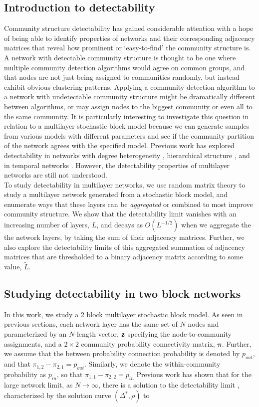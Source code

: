 \subsection{Introduction to detectability}
Community structure detectability has gained considerable attention \cite{detect20,detect21,detect22,detect23,detect24,detect25} with a hope of being able to identify properties of networks and their corresponding adjacency matrices that reveal how prominent or `easy-to-find' the community structure is. A network with detectable community structure is thought to be one where multiple community detection algorithms would agree on common groups, and that nodes are not just being assigned to communities randomly, but instead exhibit obvious clustering patterns. Applying a community detection algorithm to a network with undetectable community structure might be dramatically different between algorithms, or may assign nodes to the biggest community or even all to the same community. It is particularly interesting to investigate this question in relation to a multilayer stochastic block model because we can generate samples from various models with different parameters and see if the community partition of the network agrees with the specified model. Previous work has explored detectability in networks with degree heterogeneity \cite{detectDegreeHetero}, hierarchical structure \cite{peixotoHierarchAttribute,HierarchAttl}, and in temporal networks \cite{detectTemporal}.  However, the detectability properties of multilayer networks are still not understood. \\
\indent To study detectability in multilayer networks, we use random matrix theory to study a multilayer network generated from a stochastic block model, and enumerate ways that these layers can be \emph{aggregated} or combined to most improve community structure. We show that the detectability limit vanishes with an increasing number of layers, $L$, and decays as $O(L^{-1/2})$ when we aggregate the the network layers, by taking the sum of their adjacency matrices. Further, we also explore the detectability limits of this aggregated summation of adjacency matrices  that are thresholded to a binary adjacency matrix according to some value, $\tilde{L}$.  

\subsection{Studying detectability in two block networks}
In this work, we study a 2 block multilayer stochastic block model. As seen in previous sections, each network layer has the same set of $N$ nodes and parameterized by an $N$-length vector, ${\bf z}$ specifying the node-to-community assignments, and a $2 \times 2$ community probability connectivity matrix, ${\boldsymbol \pi}$. Further, we assume that the between probability connection probability is denoted by $p_{out}$, and that $\pi_{1,2}-\pi_{2,1}=p_{out}$. Similarly, we denote the within-community probability as $p_{in}$, so that $\pi_{1,1}-\pi_{2,2}=p_{in}$ Previous work has shown that for the large network limit, as $N \rightarrow \infty$, there is a solution to the detectability limit \cite{detect23,detect24}, characterized by the solution curve $(\Delta^{*},\rho)$ to 

